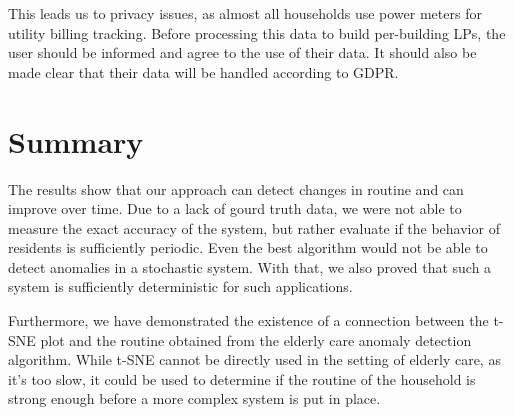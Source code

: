 This leads us to privacy issues, as almost all households use power meters for utility billing tracking. Before processing this data to build per-building LPs, the user should be informed and agree to the use of their data.
It should also be made clear that their data will be handled according to GDPR.

\section{Summary}

The results show that our approach can detect changes in routine and can improve over time.
Due to a lack of gourd truth data, we were not able to measure the exact accuracy of the system,
but rather evaluate if the behavior of residents is sufficiently periodic.
Even the best algorithm would not be able to detect anomalies in a stochastic system.
With that, we also proved that such a system is sufficiently deterministic for such applications.

Furthermore, we have demonstrated the existence of a connection between the t-SNE plot and the routine obtained from the elderly care anomaly detection algorithm.
While t-SNE cannot be directly used in the setting of elderly care, as it's too slow, it could be used to determine if the routine of the household is strong enough before a more complex system is put in place.

